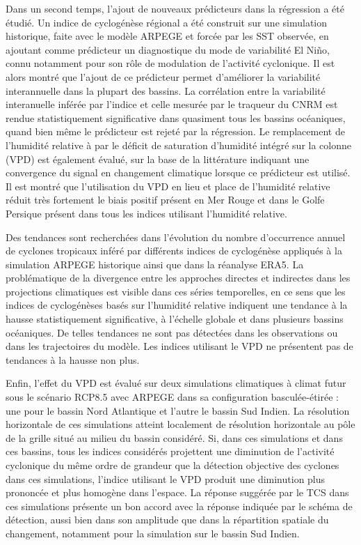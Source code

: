 \documentclass[../main.tex]{subfiles}
\begin{document}
Dans un second temps, l'ajout de nouveaux prédicteurs dans la régression a été étudié. Un indice de cyclogénèse régional a été construit sur une simulation
historique, faite avec le modèle ARPEGE et forcée par les SST observée, en ajoutant comme prédicteur un diagnostique du mode de variabilité El Niño, connu
notamment pour son rôle de modulation de l'activité cyclonique. Il est alors montré que l'ajout de ce prédicteur permet d'améliorer la variabilité interannuelle
dans la plupart des bassins. La corrélation entre la variabilité interanuelle inférée par l'indice et celle mesurée par le traqueur du CNRM est rendue
statistiquement significative dans quasiment tous les bassins océaniques, quand bien même le prédicteur est rejeté par la régression. Le remplacement de
l'humidité relative à  par le déficit de saturation d'humidité intégré sur la colonne (VPD) est également évalué, sur la base de la littérature
indiquant une convergence du signal en changement climatique lorsque ce prédicteur est utilisé. Il est montré que l'utilisation du VPD en lieu et place de
l'humidité relative réduit très fortement le biais positif présent en Mer Rouge et dans le Golfe Persique présent dans tous les indices utilisant l'humidité
relative.

Des tendances sont recherchées dans l'évolution du nombre d'occurrence annuel de cyclones tropicaux inféré par différents indices de cyclogénèse appliqués à la
simulation ARPEGE historique ainsi que dans la réanalyse ERA5. La problématique de la divergence entre les approches directes et indirectes dans les projections
climatiques est visible dans ces séries temporelles, en ce sens que les indices de cyclogénèses basés sur l'humidité relative indiquent une tendance à la hausse
statistiquement significative, à l'échelle globale et dans plusieurs bassins océaniques. De telles tendances ne sont pas détectées dans les observations ou
dans les trajectoires du modèle. Les indices utilisant le VPD ne présentent pas de tendances à la hausse non plus.

Enfin, l'effet du VPD est évalué sur deux simulations climatiques à climat futur sous le scénario RCP8.5 avec ARPEGE dans sa configuration basculée-étirée : une
pour le bassin Nord Atlantique et l'autre le bassin Sud Indien. La résolution horizontale de ces simulations atteint localement  de résolution
horizontale au pôle de la grille situé au milieu du bassin considéré. Si, dans ces simulations et dans ces bassins, tous les indices considérés projettent une
diminution de l'activité cyclonique du même ordre de grandeur que la détection objective des cyclones dans ces simulations, l'indice utilisant le VPD produit
une diminution plus prononcée et plus homogène dans l'espace. La réponse suggérée par le TCS dans ces simulations présente un bon accord avec la réponse
indiquée par le schéma de détection, aussi bien dans son amplitude que dans la répartition spatiale du changement, notamment pour la simulation sur le bassin
Sud Indien.
\end{document}
